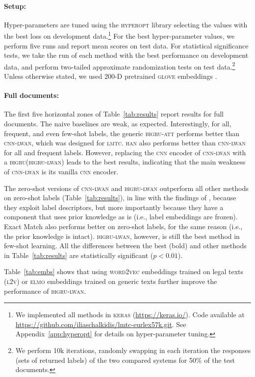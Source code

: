 \documentclass[11pt,a4paper]{article}
\newcommand{\bigruatt}{\textsc{bigru-att}\xspace}
\newcommand{\bigru}{\textsc{bigru}\xspace}
\newcommand{\wordvec}{\textsc{word2vec}\xspace}
\newcommand{\cnn}{\textsc{cnn}\xspace}
\newcommand{\han}{\textsc{han}\xspace}
\newcommand{\lmtc}{\textsc{lmtc}\xspace}
\newcommand{\lwancnn}{\textsc{cnn-lwan}\xspace}
\newcommand{\lwangru}{\textsc{bigru-lwan}\xspace}
\newcommand{\glove}{\textsc{glove}\xspace}
\newcommand{\lawvec}{\textsc{l2v}\xspace}
\newcommand{\elmo}{\textsc{elmo}\xspace}
\begin{document}
\paragraph{Setup:} 
Hyper-parameters are tuned using the \textsc{hyperopt} library selecting the values with the best loss on development data.\footnote{We implemented all methods in \textsc{keras} (\url{https://keras.io/}). Code available at \url{https://github.com/iliaschalkidis/lmtc-eurlex57k.git}. See Appendix~\ref{app:hyperopt} for details on hyper-parameter tuning.} For the best hyper-parameter values, we perform five runs and report mean scores on test data. For statistical significance tests, we take the run of each method with the best performance on development data, and perform two-tailed approximate randomization tests \cite{Dror2018} on test data.\footnote{We perform 10k iterations, randomly swapping in each iteration the responses (sets of returned labels) of the two compared systems for 50\% of the test documents.} Unless otherwise stated, we used 200-D pretrained \glove embeddings \cite{pennington2014glove}.

\paragraph{Full documents:}
\label{sec:overall}
The first five horizontal zones of Table~\ref{tab:results} report results for full documents. The naive baselines are weak, as expected. Interestingly, for all, frequent, and even few-shot labels, the generic \bigruatt performs better than \lwancnn, which was designed for \lmtc. \han also performs better than \lwancnn for all and frequent labels. However, replacing the \cnn encoder of \lwancnn with a \bigru (\lwangru) leads to the best results, indicating that the main weakness of \lwancnn is its vanilla \cnn encoder.

The zero-shot versions of \lwancnn and \lwangru outperform all other  methods on zero-shot labels (Table~\ref{tab:results}), in line with the findings of \citet{Rios2018-2}, because they exploit label descriptors,
but more importantly because they have a component that uses prior knowledge as is (i.e., label embeddings are frozen). Exact Match also performs better on zero-shot labels, for the same reason (i.e., the prior knowledge is intact). \lwangru, however, is still the best method in few-shot learning. All the differences between the best (bold) and other methods in Table~\ref{tab:results} are statistically significant ($p < 0.01$).

Table~\ref{tab:embs} shows that using \wordvec embeddings trained on legal texts (\lawvec) \cite{Chalkidis2018} or \elmo embeddings \cite{Peters2018} trained on generic texts further improve the performance of \lwangru. 
\end{document}
